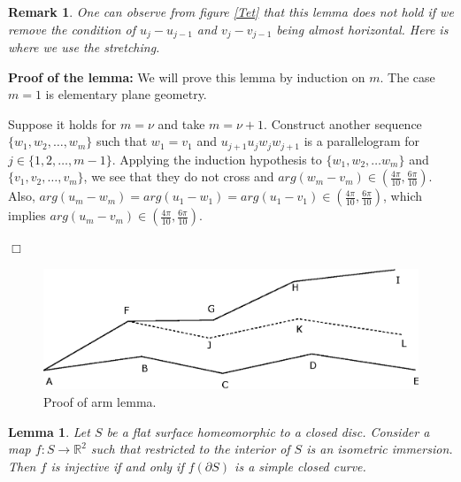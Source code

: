 \documentclass[openright, 12pt]{article}
\newtheorem{lema}[teorema]{Lemma}
\newtheorem{rem}[teorema]{Remark}
\begin{document}
\begin{rem}
{\rm One can observe from figure \ref{Tet} that this lemma does not hold if  we remove the condition of $u_{j }- u_{j-1}$ and $ v_j - v_{j-1} $ being almost horizontal. Here is where we use the stretching. 
}
\end{rem}




\textbf{Proof of the lemma: }We will prove this lemma by induction on $m$. The case $m=1$ is elementary plane geometry.


Suppose it holds for $m=\nu$ and take $m = \nu +1$. Construct another sequence $\{ w_1, w_2, \ldots, w_m   \}$ such that $w_1 = v_1$ and $u_{j+1}u_jw_jw_{j+1} $ is a parallelogram for $j \in \{ 1, 2, \ldots , m-1\} $. Applying the induction hypothesis to $\{ w_1, w_2, \ldots w_m   \}$ and $\{v_1, v_2, \ldots, v_m  \}$, we see that they do not cross and $arg( w_{m} - v_m) \in \left(  \frac{4 \pi}{10} , \frac{6\pi}{10}  \right)$. Also, $arg(u_m - w_m )= arg (u_1 - w_1) = arg (u_1 - v_1) \in \left(  \frac{4 \pi}{10} , \frac{6\pi}{10}  \right)$, which implies $arg(u_m - v_m)\in \left(  \frac{4 \pi}{10} , \frac{6\pi}{10}  \right)$.

\hfill $\Box$


\begin{figure}[h]
\centering
{}
\includegraphics[scale=0.95]{arms.eps}
\caption{Proof of arm lemma.}
\end{figure}



\begin{lema}\label{Argument}
{\rm Let $S$ be a flat surface homeomorphic to a closed disc. Consider a map $f: S \rightarrow \mathbb{R}^2$ such that restricted to the interior of $S$ is an isometric immersion. Then $f$ is injective if and only if $f(\partial S)$ is a simple closed curve. 
}
\end{lema}
\end{document}
